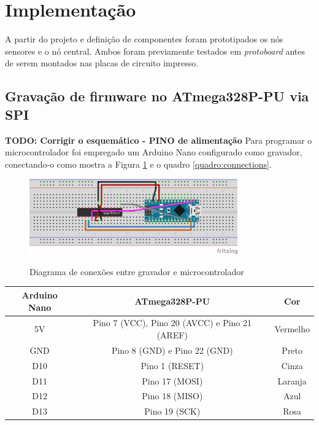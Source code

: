 \documentclass[oneside,openright,12pt]{ufsm_2015} %
\begin{document}
    \section{Implementação}
    A partir do projeto e definição de componentes foram prototipados os nós sensores e o nó central. Ambos foram previamente testados em \textit{protoboard} antes de serem montados nas placas de circuito impresso. 
    
    \subsection{Gravação de firmware no ATmega328P-PU via SPI}
    \textbf{TODO: Corrigir o esquemático - PINO de alimentação}
    Para programar o microcontrolador foi empregado um Arduino Nano configurado como gravador, conectando-o como mostra a Figura \ref{fig:gravador-sensor-node} e o quadro \ref{quadro:connections}. 
    
    \begin{figure}[ht]
 	    \caption{\label{exepretex} Diagrama de conexões entre gravador e microcontrolador}
        \centering
        \includegraphics[width=0.8\textwidth]{figuras/firmware-programmer_bb.png}
        \vspace{\baselineskip} %
        \label{fig:gravador-sensor-node}
    \end{figure}
    
    \begin{quadro}
   	    \caption{Conexões para gravação de \textit{firmware}}
	    \centering
	    \begin{tabular}{| c | c | c | }
	    \hline
	    Arduino Nano & ATmega328P-PU & Cor\\
	    \hline
	    5V & Pino 7 (VCC), Pino 20 (AVCC) e Pino 21 (AREF) & Vermelho\\
	    \hline
	    GND & Pino 8 (GND) e Pino 22 (GND) & Preto\\
	    \hline
	    D10 & Pino 1 (RESET) & Cinza\\
	    \hline
	    D11 & Pino 17 (MOSI) & Laranja\\
	    \hline
	    D12 & Pino 18 (MISO) & Azul\\
	    \hline
	    D13 & Pino 19 (SCK) & Rosa\\
	    \hline
	    \end{tabular}
	    \vspace{\baselineskip} %
	    \label{quadro:connections}
\end{quadro}
    
\end{document}
